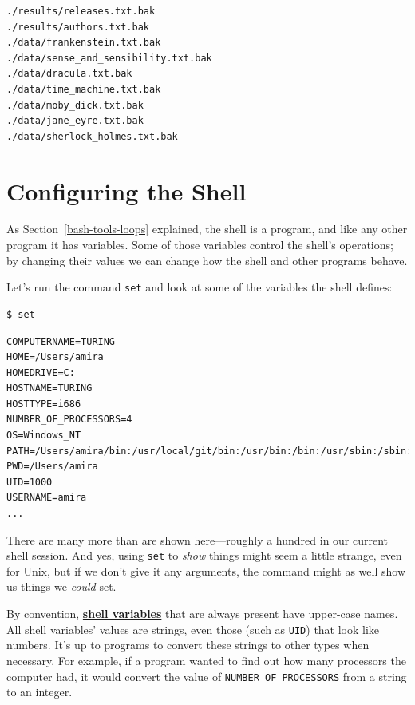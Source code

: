\documentclass[
]{krantz}
\newcommand{\gref}[2]{\hyperlink{#2}{\textbf{#1}}}
\begin{document}
\begin{verbatim}
./results/releases.txt.bak
./results/authors.txt.bak
./data/frankenstein.txt.bak
./data/sense_and_sensibility.txt.bak
./data/dracula.txt.bak
./data/time_machine.txt.bak
./data/moby_dick.txt.bak
./data/jane_eyre.txt.bak
./data/sherlock_holmes.txt.bak
\end{verbatim}

\hypertarget{bash-advanced-vars}{%
\section{Configuring the Shell}\label{bash-advanced-vars}}

As Section~\ref{bash-tools-loops} explained,
the shell is a program,
and like any other program it has variables.
Some of those variables control the shell's operations;
by changing their values
we can change how the shell and other programs behave.

Let's run the command \texttt{set}
and look at some of the variables the shell defines:

\begin{verbatim}
$ set
\end{verbatim}

\begin{verbatim}
COMPUTERNAME=TURING
HOME=/Users/amira
HOMEDRIVE=C:
HOSTNAME=TURING
HOSTTYPE=i686
NUMBER_OF_PROCESSORS=4
OS=Windows_NT
PATH=/Users/amira/bin:/usr/local/git/bin:/usr/bin:/bin:/usr/sbin:/sbin:/usr/local/bin
PWD=/Users/amira
UID=1000
USERNAME=amira
...
\end{verbatim}

There are many more than are shown here---roughly a hundred
in our current shell session.
And yes,
using \texttt{set} to \emph{show} things might seem a little strange,
even for Unix,
but if we don't give it any arguments,
the command might as well show us things we \emph{could} set.

By convention,
\gref{shell variables}{shell\_variable} that are always present have upper-case names.
All shell variables' values are strings,
even those (such as \texttt{UID}) that look like numbers.
It's up to programs to convert these strings to other types when necessary.
For example,
if a program wanted to find out how many processors the computer had,
it would convert the value of \texttt{NUMBER\_OF\_PROCESSORS} from a string to an integer.
\end{document}
